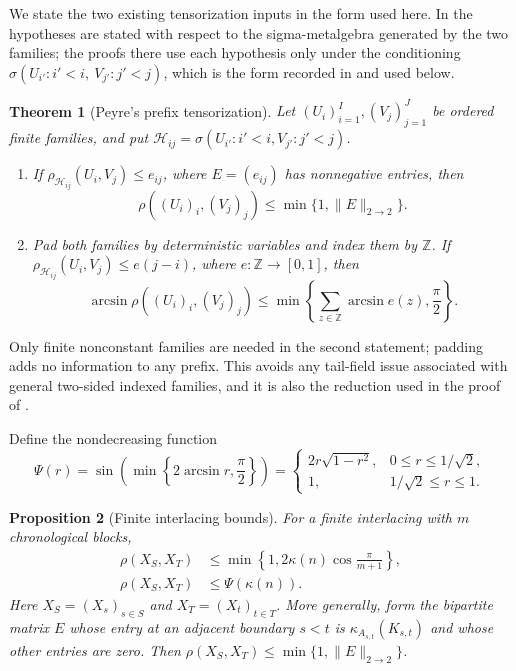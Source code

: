 \documentclass[11pt]{amsart}
\numberwithin{equation}{section}
\newtheorem{theorem}{Theorem}[section]
\newtheorem{proposition}[theorem]{Proposition}
\theoremstyle{definition}
\newcommand{\ZZ}{\mathbb Z}
\newcommand{\cH}{\mathcal H}
\begin{document}
We state the two existing tensorization inputs in the form used here. In \cite[Theorems~3.3.1 and~3.3.10]{Peyre2010} the hypotheses are stated with respect to the sigma-metalgebra generated by the two families; the proofs there use each hypothesis only under the conditioning $\sigma(U_{i'}:i'<i,\ V_{j'}:j'<j)$, which is the form recorded in \cite[Section~3.4(a)]{Peyre2010} and used below.

\begin{theorem}[Peyre's prefix tensorization]\label{thm:peyre}
Let $(U_i)_{i=1}^I,(V_j)_{j=1}^J$ be ordered finite families, and put $\cH_{ij}=\sigma(U_{i'}:i'<i,V_{j'}:j'<j)$.
\begin{enumerate}
\item If $\rho_{\cH_{ij}}(U_i,V_j)\le e_{ij}$, where $E=(e_{ij})$ has nonnegative entries, then
\begin{equation}\label{eq:peyre-matrix}
\rho((U_i)_i,(V_j)_j)\le\min\{1,\|E\|_{2\to2}\}.
\end{equation}
\item Pad both families by deterministic variables and index them by $\ZZ$. If $\rho_{\cH_{ij}}(U_i,V_j)\le e(j-i)$, where $e:\ZZ\to[0,1]$, then
\begin{equation}\label{eq:peyre-arcsine}
\arcsin\rho((U_i)_i,(V_j)_j)
\le\min\left\{\sum_{z\in\ZZ}\arcsin e(z),\frac\pi2\right\}.
\end{equation}
\end{enumerate}
\end{theorem}

Only finite nonconstant families are needed in the second statement; padding adds no information to any prefix. This avoids any tail-field issue associated with general two-sided indexed families, and it is also the reduction used in the proof of \cite[Theorem~3.3.10]{Peyre2010}.

Define the nondecreasing function
\begin{equation}\label{eq:psi}
\Psi(r)=\sin\!\left(\min\left\{2\arcsin r,\frac\pi2\right\}\right)
=\begin{cases}
2r\sqrt{1-r^2},&0\le r\le1/\sqrt2,\\
1,&1/\sqrt2\le r\le1.
\end{cases}
\end{equation}

\begin{proposition}[Finite interlacing bounds]\label{prop:finite}
For a finite interlacing with $m$ chronological blocks,
\begin{align}
\rho(X_S,X_T)&\le\min\left\{1,2\kappa(n)\cos\frac\pi{m+1}\right\},\label{eq:finite-path}\\
\rho(X_S,X_T)&\le\Psi(\kappa(n)).\label{eq:finite-arcsine}
\end{align}
Here $X_S=(X_s)_{s\in S}$ and $X_T=(X_t)_{t\in T}$. More generally, form the bipartite matrix $E$ whose entry at an adjacent boundary $s<t$ is $\kappa_{A_{s,t}}(K_{s,t})$ and whose other entries are zero. Then $\rho(X_S,X_T)\le\min\{1,\|E\|_{2\to2}\}$.
\end{proposition}
\end{document}
